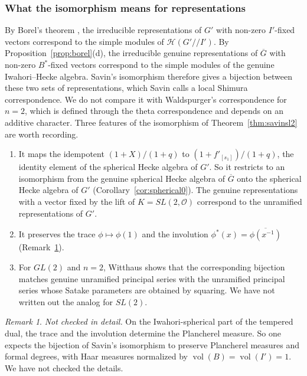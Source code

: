 \documentclass[12pt,letterpaper]{amsart}
\numberwithin{equation}{section}
\theoremstyle{definition}
\theoremstyle{remark}
\newtheorem{vremark}{Remark}
\DeclareMathOperator{\vol}{vol}
\newcommand{\cO}{\mathcal{O}}
\newcommand{\cH}{\mathcal{H}}
\newcommand{\Gbar}{\overline{G}}
\begin{document}
\subsubsection{What the isomorphism means for representations}
By Borel's theorem \cite{Bo76}, the irreducible representations of $G'$
with non-zero $I'$-fixed vectors correspond to the simple modules of
$\cH(G'/\!/I')$. By Proposition~\ref{prop:borel}(d), the irreducible
genuine representations of $\Gbar$ with non-zero $B^*$-fixed vectors
correspond to the simple modules of the genuine Iwahori--Hecke
algebra. Savin's isomorphism therefore gives a bijection between these
two sets of representations, which Savin calls a local Shimura
correspondence. We do not compare it with Waldspurger's correspondence
\cite{Wa80} for $n=2$, which is defined through the theta
correspondence and depends on an additive character. Three features of
the isomorphism of Theorem~\ref{thm:savinsl2} are worth recording.
\begin{enumerate}[leftmargin=2em,label=(\roman*)]
\item It maps the idempotent $(1+X)/(1+q)$ to $(1+f'_{[s_1]})/(1+q)$,
the identity element of the spherical Hecke algebra of $G'$. So it
restricts to an isomorphism from the genuine spherical Hecke algebra of
$\Gbar$ onto the spherical Hecke algebra of $G'$
(Corollary~\ref{cor:spherical0}). The genuine representations with a
vector fixed by the lift of $K=SL(2,\cO)$ correspond to the unramified
representations of $G'$.
\item It preserves the trace $\phi\mapsto\phi(1)$ and the involution
$\phi^*(x)=\overline{\phi(x^{-1})}$ (Remark~\ref{vrem:plancherel}).
\item For $GL(2)$ and $n=2$, Witthaus \cite[Lemma~6.3]{Wi22} shows that
the corresponding bijection matches genuine unramified principal series
with the unramified principal series whose Satake parameters are
obtained by squaring. We have not written out the analog for $SL(2)$.
\end{enumerate}

\begin{vremark}
\label{vrem:plancherel}
\emph{Not checked in detail.} On the Iwahori-spherical part of the
tempered dual, the trace and the involution determine the Plancherel
measure. So one expects the bijection of Savin's isomorphism to
preserve Plancherel measures and formal degrees, with Haar measures
normalized by $\vol(B)=\vol(I')=1$. We have not checked the details.
\end{vremark}
\end{document}
